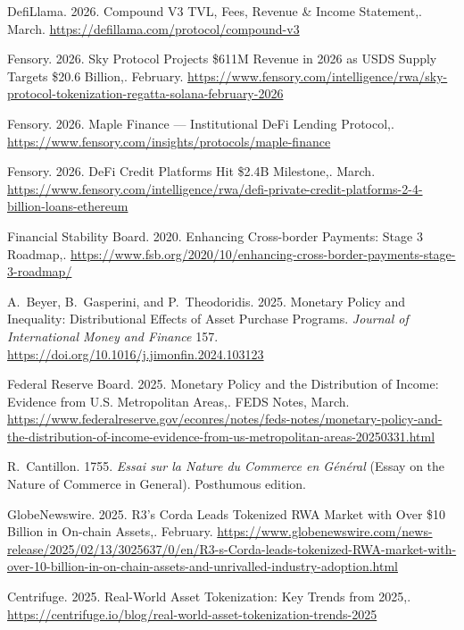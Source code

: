 {\begin{enumerate}[label={[\arabic*]}]
\item DefiLlama. 2026. Compound V3 TVL, Fees, Revenue \& Income Statement,. March. \url{https://defillama.com/protocol/compound-v3}

\item Fensory. 2026. Sky Protocol Projects \$611M Revenue in 2026 as USDS Supply Targets \$20.6 Billion,. February. \url{https://www.fensory.com/intelligence/rwa/sky-protocol-tokenization-regatta-solana-february-2026}

\item Fensory. 2026. Maple Finance --- Institutional DeFi Lending Protocol,. \url{https://www.fensory.com/insights/protocols/maple-finance}

\item Fensory. 2026. DeFi Credit Platforms Hit \$2.4B Milestone,. March. \url{https://www.fensory.com/intelligence/rwa/defi-private-credit-platforms-2-4-billion-loans-ethereum}

\item Financial Stability Board. 2020. Enhancing Cross-border Payments: Stage 3 Roadmap,. \url{https://www.fsb.org/2020/10/enhancing-cross-border-payments-stage-3-roadmap/}

\item A.~Beyer, B.~Gasperini, and P.~Theodoridis. 2025. Monetary Policy and Inequality: Distributional Effects of Asset Purchase Programs. \emph{Journal of International Money and Finance} 157. \url{https://doi.org/10.1016/j.jimonfin.2024.103123}

\item Federal Reserve Board. 2025. Monetary Policy and the Distribution of Income: Evidence from U.S. Metropolitan Areas,. FEDS Notes, March. \url{https://www.federalreserve.gov/econres/notes/feds-notes/monetary-policy-and-the-distribution-of-income-evidence-from-us-metropolitan-areas-20250331.html}

\item R.~Cantillon. 1755. \emph{Essai sur la Nature du Commerce en G\'en\'eral} (Essay on the Nature of Commerce in General). Posthumous edition.

\item GlobeNewswire. 2025. R3's Corda Leads Tokenized RWA Market with Over \$10 Billion in On-chain Assets,. February. \url{https://www.globenewswire.com/news-release/2025/02/13/3025637/0/en/R3-s-Corda-leads-tokenized-RWA-market-with-over-10-billion-in-on-chain-assets-and-unrivalled-industry-adoption.html}

\item Centrifuge. 2025. Real-World Asset Tokenization: Key Trends from 2025,. \url{https://centrifuge.io/blog/real-world-asset-tokenization-trends-2025}


\end{enumerate}}

